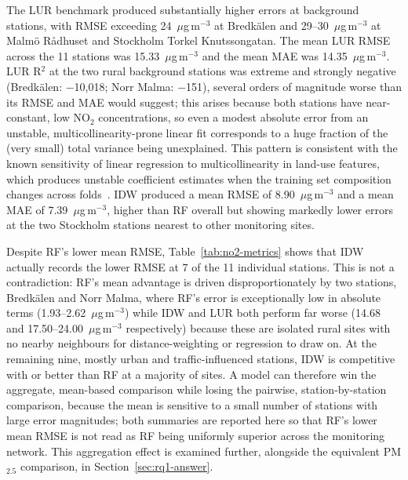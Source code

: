 \documentclass[11pt,a4paper]{article}
\begin{document}
The LUR benchmark produced substantially higher errors at background stations, with RMSE exceeding 24~$\mu$g\,m$^{-3}$ at Bredkälen and 29--30~$\mu$g\,m$^{-3}$ at Malmö Rådhuset and Stockholm Torkel Knutssongatan. The mean LUR RMSE across the 11 stations was 15.33~$\mu$g\,m$^{-3}$ and the mean MAE was 14.35~$\mu$g\,m$^{-3}$. LUR R$^2$ at the two rural background stations was extreme and strongly negative (Bredkälen: $-$10{,}018; Norr Malma: $-$151), several orders of magnitude worse than its RMSE and MAE would suggest; this arises because both stations have near-constant, low NO$_2$ concentrations, so even a modest absolute error from an unstable, multicollinearity-prone linear fit corresponds to a huge fraction of the (very small) total variance being unexplained. This pattern is consistent with the known sensitivity of linear regression to multicollinearity in land-use features, which produces unstable coefficient estimates when the training set composition changes across folds~\cite{hoek_lur_review_2008}. IDW produced a mean RMSE of 8.90~$\mu$g\,m$^{-3}$ and a mean MAE of 7.39~$\mu$g\,m$^{-3}$, higher than RF overall but showing markedly lower errors at the two Stockholm stations nearest to other monitoring sites.

Despite RF's lower mean RMSE, Table~\ref{tab:no2-metrics} shows that IDW actually records the lower RMSE at 7 of the 11 individual stations. This is not a contradiction: RF's mean advantage is driven disproportionately by two stations, Bredkälen and Norr Malma, where RF's error is exceptionally low in absolute terms (1.93--2.62~$\mu$g\,m$^{-3}$) while IDW and LUR both perform far worse (14.68 and 17.50--24.00~$\mu$g\,m$^{-3}$ respectively) because these are isolated rural sites with no nearby neighbours for distance-weighting or regression to draw on. At the remaining nine, mostly urban and traffic-influenced stations, IDW is competitive with or better than RF at a majority of sites. A model can therefore win the aggregate, mean-based comparison while losing the pairwise, station-by-station comparison, because the mean is sensitive to a small number of stations with large error magnitudes; both summaries are reported here so that RF's lower mean RMSE is not read as RF being uniformly superior across the monitoring network. This aggregation effect is examined further, alongside the equivalent PM$_{2.5}$ comparison, in Section~\ref{sec:rq1-answer}.
\end{document}
